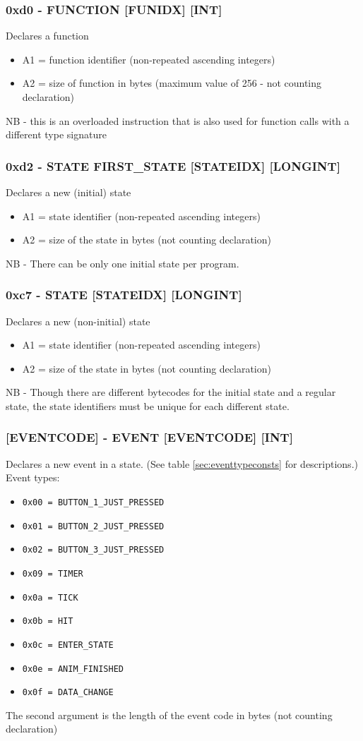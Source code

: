 \documentclass[12pt,a4paper]{scrbook}
\begin{document}
\subsubsection{0xd0 - FUNCTION [FUNIDX] [INT]}
Declares a function
\begin{itemize}
\item A1 = function identifier (non-repeated ascending integers)
\item A2 = size of function in bytes (maximum value of 256 - not counting declaration)
\end{itemize}
NB - this is an overloaded instruction that is also used for function calls with a different type
signature

\subsubsection{0xd2 - STATE FIRST\_STATE [STATEIDX] [LONGINT]}
Declares a new (initial) state
\begin{itemize}
\item A1 = state identifier (non-repeated ascending integers)
\item A2 = size of the state in bytes (not counting declaration)
\end{itemize}
NB - There can be only one initial state per program.

\subsubsection{0xc7 - STATE [STATEIDX] [LONGINT]}
Declares a new (non-initial) state
\begin{itemize}
\item A1 = state identifier (non-repeated ascending integers)
\item A2 = size of the state in bytes (not counting declaration)
\end{itemize}
NB - Though there are different bytecodes for the initial state and a regular state,
the state identifiers must be unique for each different state.

\subsubsection{[EVENTCODE] - EVENT [EVENTCODE] [INT]}
Declares a new event in a state.  (See table \ref{sec:eventtypeconsts} for descriptions.)
Event types:
\begin{itemize}
\item \texttt{0x00 = BUTTON\_1\_JUST\_PRESSED}
\item \texttt{0x01 = BUTTON\_2\_JUST\_PRESSED}
\item \texttt{0x02 = BUTTON\_3\_JUST\_PRESSED}
\item \texttt{0x09 = TIMER}
\item \texttt{0x0a = TICK}
\item \texttt{0x0b = HIT}
\item \texttt{0x0c = ENTER\_STATE}
\item \texttt{0x0e = ANIM\_FINISHED}
\item \texttt{0x0f = DATA\_CHANGE}
\end{itemize}
The second argument is the length of the event code in bytes (not counting declaration)
\end{document}
